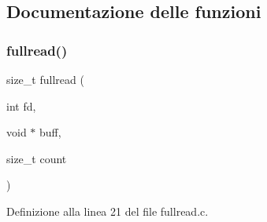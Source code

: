 \subsection{Documentazione delle funzioni}
\mbox{\label{a00008_aa6e2320d0a4267b15084f5eed8187380}} 
\subsubsection{\texorpdfstring{fullread()}{fullread()}}
{\footnotesize\ttfamily size\+\_\+t fullread (\begin{DoxyParamCaption}\item[{int}]{fd,  }\item[{void $\ast$}]{buff,  }\item[{size\+\_\+t}]{count }\end{DoxyParamCaption})}



Definizione alla linea 21 del file fullread.\+c.

